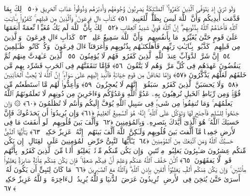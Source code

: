  وَلَو تَرَىٰٓ إِذ يَتَوَفَّى ٱلَّذِينَ كَفَرُوا۟ ۙ ٱلمَلَـٰٓئِكَةُ يَضرِبُونَ وُجُوهَهُم وَأَدبَٰرَهُم وَذُوقُوا۟ عَذَابَ ٱلحَرِيقِ ﴿٥٠﴾
 ذَٟلِكَ بِمَا قَدَّمَت أَيدِيكُم وَأَنَّ ٱللَّهَ لَيسَ بِظَلَّٰمٍۢ لِّلعَبِيدِ ﴿٥١﴾
 كَدَأبِ ءَالِ فِرعَونَ ۙ وَٱلَّذِينَ مِن قَبلِهِم ۚ كَفَرُوا۟ بِـَٔايَـٰتِ ٱللَّهِ فَأَخَذَهُمُ ٱللَّهُ بِذُنُوبِهِم ۗ إِنَّ ٱللَّهَ قَوِىٌّۭ شَدِيدُ ٱلعِقَابِ ﴿٥٢﴾
 ذَٟلِكَ بِأَنَّ ٱللَّهَ لَم يَكُ مُغَيِّرًۭا نِّعمَةً أَنعَمَهَا عَلَىٰ قَومٍ حَتَّىٰ يُغَيِّرُوا۟ مَا بِأَنفُسِهِم ۙ وَأَنَّ ٱللَّهَ سَمِيعٌ عَلِيمٌۭ ﴿٥٣﴾
 كَدَأبِ ءَالِ فِرعَونَ ۙ وَٱلَّذِينَ مِن قَبلِهِم ۚ كَذَّبُوا۟ بِـَٔايَـٰتِ رَبِّهِم فَأَهلَكنَـٰهُم بِذُنُوبِهِم وَأَغرَقنَآ ءَالَ فِرعَونَ ۚ وَكُلٌّۭ كَانُوا۟ ظَـٰلِمِينَ ﴿٥٤﴾
 إِنَّ شَرَّ ٱلدَّوَآبِّ عِندَ ٱللَّهِ ٱلَّذِينَ كَفَرُوا۟ فَهُم لَا يُؤمِنُونَ ﴿٥٥﴾
 ٱلَّذِينَ عَـٰهَدتَّ مِنهُم ثُمَّ يَنقُضُونَ عَهدَهُم فِى كُلِّ مَرَّةٍۢ وَهُم لَا يَتَّقُونَ ﴿٥٦﴾
 فَإِمَّا تَثقَفَنَّهُم فِى ٱلحَربِ فَشَرِّد بِهِم مَّن خَلفَهُم لَعَلَّهُم يَذَّكَّرُونَ ﴿٥٧﴾
 وَإِمَّا تَخَافَنَّ مِن قَومٍ خِيَانَةًۭ فَٱنۢبِذ إِلَيهِم عَلَىٰ سَوَآءٍ ۚ إِنَّ ٱللَّهَ لَا يُحِبُّ ٱلخَآئِنِينَ ﴿٥٨﴾
 وَلَا يَحسَبَنَّ ٱلَّذِينَ كَفَرُوا۟ سَبَقُوٓا۟ ۚ إِنَّهُم لَا يُعجِزُونَ ﴿٥٩﴾
 وَأَعِدُّوا۟ لَهُم مَّا ٱستَطَعتُم مِّن قُوَّةٍۢ وَمِن رِّبَاطِ ٱلخَيلِ تُرهِبُونَ بِهِۦ عَدُوَّ ٱللَّهِ وَعَدُوَّكُم وَءَاخَرِينَ مِن دُونِهِم لَا تَعلَمُونَهُمُ ٱللَّهُ يَعلَمُهُم ۚ وَمَا تُنفِقُوا۟ مِن شَىءٍۢ فِى سَبِيلِ ٱللَّهِ يُوَفَّ إِلَيكُم وَأَنتُم لَا تُظلَمُونَ ﴿٦٠﴾
 ۞ وَإِن جَنَحُوا۟ لِلسَّلمِ فَٱجنَح لَهَا وَتَوَكَّل عَلَى ٱللَّهِ ۚ إِنَّهُۥ هُوَ ٱلسَّمِيعُ ٱلعَلِيمُ ﴿٦١﴾
 وَإِن يُرِيدُوٓا۟ أَن يَخدَعُوكَ فَإِنَّ حَسبَكَ ٱللَّهُ ۚ هُوَ ٱلَّذِىٓ أَيَّدَكَ بِنَصرِهِۦ وَبِٱلمُؤمِنِينَ ﴿٦٢﴾
 وَأَلَّفَ بَينَ قُلُوبِهِم ۚ لَو أَنفَقتَ مَا فِى ٱلأَرضِ جَمِيعًۭا مَّآ أَلَّفتَ بَينَ قُلُوبِهِم وَلَـٰكِنَّ ٱللَّهَ أَلَّفَ بَينَهُم ۚ إِنَّهُۥ عَزِيزٌ حَكِيمٌۭ ﴿٦٣﴾
 يَـٰٓأَيُّهَا ٱلنَّبِىُّ حَسبُكَ ٱللَّهُ وَمَنِ ٱتَّبَعَكَ مِنَ ٱلمُؤمِنِينَ ﴿٦٤﴾
 يَـٰٓأَيُّهَا ٱلنَّبِىُّ حَرِّضِ ٱلمُؤمِنِينَ عَلَى ٱلقِتَالِ ۚ إِن يَكُن مِّنكُم عِشرُونَ صَـٰبِرُونَ يَغلِبُوا۟ مِا۟ئَتَينِ ۚ وَإِن يَكُن مِّنكُم مِّا۟ئَةٌۭ يَغلِبُوٓا۟ أَلفًۭا مِّنَ ٱلَّذِينَ كَفَرُوا۟ بِأَنَّهُم قَومٌۭ لَّا يَفقَهُونَ ﴿٦٥﴾
 ٱلـَٰٔنَ خَفَّفَ ٱللَّهُ عَنكُم وَعَلِمَ أَنَّ فِيكُم ضَعفًۭا ۚ فَإِن يَكُن مِّنكُم مِّا۟ئَةٌۭ صَابِرَةٌۭ يَغلِبُوا۟ مِا۟ئَتَينِ ۚ وَإِن يَكُن مِّنكُم أَلفٌۭ يَغلِبُوٓا۟ أَلفَينِ بِإِذنِ ٱللَّهِ ۗ وَٱللَّهُ مَعَ ٱلصَّـٰبِرِينَ ﴿٦٦﴾
 مَا كَانَ لِنَبِىٍّ أَن يَكُونَ لَهُۥٓ أَسرَىٰ حَتَّىٰ يُثخِنَ فِى ٱلأَرضِ ۚ تُرِيدُونَ عَرَضَ ٱلدُّنيَا وَٱللَّهُ يُرِيدُ ٱلءَاخِرَةَ ۗ وَٱللَّهُ عَزِيزٌ حَكِيمٌۭ ﴿٦٧﴾
